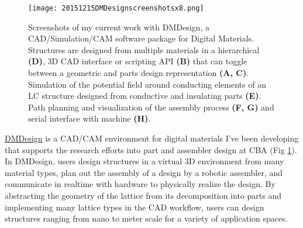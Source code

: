 {\begin{figure}
  \texttt{[image: 20151215DMDesignscreenshotsx8.png]}
  \caption{Screenshots of my current work with DMDesign, a CAD/Simulation/CAM software package for Digital Materials. Structures are designed from multiple materials in a hierarchical \textbf{(D)}, 3D CAD interface or scripting API \textbf{(B)} that can toggle between a geometric and parts design representation \textbf{(A, C)}. Simulation of the potential field around conducting elements of an LC structure designed from conductive and insulating parts \textbf{(E)}. Path planning and visualization of the assembly process \textbf{(F, G)} and serial interface with machine \textbf{(H)}.}
  \label{fig: designAssemblyGUIWide}
\end{figure}
\href{http://dma.cba.mit.edu/dmdesign/}{DMDesign} is a CAD/CAM environment for digital materials I've been developing that supports the research efforts into part and assembler design at CBA (Fig \ref{fig: designAssemblyGUIWide}).  In DMDesign, users design structures in a virtual 3D environment from many material types, plan out the assembly of a design by a robotic assembler, and communicate in realtime with hardware to physically realize the design\cite{LangfordWillGhassaeiAmandaGershenfeld2016}.  By abstracting the geometry of the lattice from its decomposition into parts and implementing many lattice types in the CAD workflow, users can design structures ranging from nano to meter scale for a variety of application spaces.

}